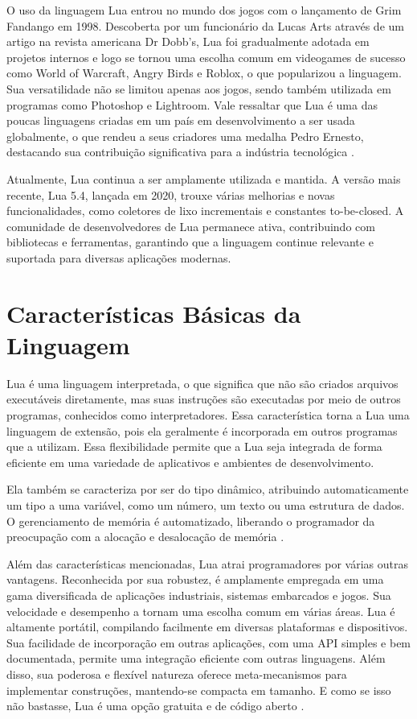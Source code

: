 \documentclass[12pt]{article}
\begin{document}
O uso da linguagem Lua entrou no mundo dos jogos com o lançamento de Grim Fandango em 1998. Descoberta por um funcionário da Lucas Arts através de um artigo na revista americana Dr Dobb's, Lua foi gradualmente adotada em projetos internos e logo se tornou uma escolha comum em videogames de sucesso como World of Warcraft, Angry Birds e Roblox, o que popularizou a linguagem. Sua versatilidade não se limitou apenas aos jogos, sendo também utilizada em programas como Photoshop e Lightroom. Vale ressaltar que Lua é uma das poucas linguagens criadas em um país em desenvolvimento a ser usada globalmente, o que rendeu a seus criadores uma medalha Pedro Ernesto, destacando sua contribuição significativa para a indústria tecnológica \cite{lua-puc}.

Atualmente, Lua continua a ser amplamente utilizada e mantida. A versão mais recente, Lua 5.4, lançada em 2020, trouxe várias melhorias e novas funcionalidades, como coletores de lixo incrementais e constantes to-be-closed. A comunidade de desenvolvedores de Lua permanece ativa, contribuindo com bibliotecas e ferramentas, garantindo que a linguagem continue relevante e suportada para diversas aplicações modernas.

\section{Características Básicas da Linguagem}
Lua é uma linguagem interpretada, o que significa que não são criados arquivos executáveis diretamente, mas suas instruções são executadas por meio de outros programas, conhecidos como interpretadores. Essa característica torna a Lua uma linguagem de extensão, pois ela geralmente é incorporada em outros programas que a utilizam. Essa flexibilidade permite que a Lua seja integrada de forma eficiente em uma variedade de aplicativos e ambientes de desenvolvimento.

Ela também se caracteriza por ser do tipo dinâmico, atribuindo automaticamente um tipo a uma variável, como um número, um texto ou uma estrutura de dados. O gerenciamento de memória é automatizado, liberando o programador da preocupação com a alocação e desalocação de memória \cite{lua-edu}.

Além das características mencionadas, Lua atrai programadores por várias outras vantagens. Reconhecida por sua robustez, é amplamente empregada em uma gama diversificada de aplicações industriais, sistemas embarcados e jogos. Sua velocidade e desempenho a tornam uma escolha comum em várias áreas. Lua é altamente portátil, compilando facilmente em diversas plataformas e dispositivos. Sua facilidade de incorporação em outras aplicações, com uma API simples e bem documentada, permite uma integração eficiente com outras linguagens. Além disso, sua poderosa e flexível natureza oferece meta-mecanismos para implementar construções, mantendo-se compacta em tamanho. E como se isso não bastasse, Lua é uma opção gratuita e de código aberto \cite{lua-official}.
\end{document}
